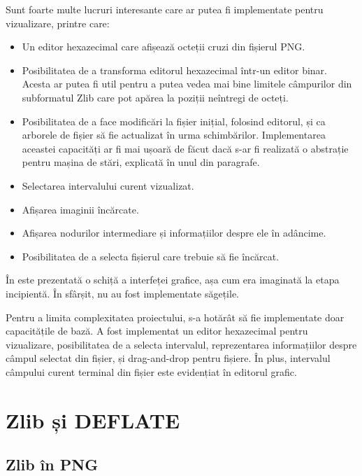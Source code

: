 \documentclass[a4paper,12pt]{report}
\begin{document}
Sunt foarte multe lucruri interesante care ar putea fi implementate pentru vizualizare, printre care:
\begin{itemize}
    \item
        Un editor hexazecimal care afișează octeții cruzi din fișierul \ac{PNG}. 
    \item
        Posibilitatea de a transforma editorul hexazecimal într-un editor binar.
        Acesta ar putea fi util pentru a putea vedea mai bine limitele câmpurilor din
        subformatul Zlib care pot apărea la poziții neîntregi de octeți.
    \item
        Posibilitatea de a face modificări la fișier inițial, folosind editorul,
        și ca arborele de fișier să fie actualizat în urma schimbărilor.
        Implementarea aceastei capacități ar fi mai ușoară de făcut dacă s-ar fi realizată
        o abstrație pentru mașina de stări, explicată în unul din paragrafe.
    \item
        Selectarea intervalului curent vizualizat.
    \item
        Afișarea imaginii încărcate.
    \item
        Afișarea nodurilor intermediare și informațiilor despre ele în adâncime.
    \item
        Posibilitatea de a selecta fișierul care trebuie să fie încărcat.
\end{itemize}

În  este prezentată o schiță a interfeței grafice,
așa cum era imaginată la etapa incipientă.
În sfârșit, nu au fost implementate săgețile.


Pentru a limita complexitatea proiectului, s-a hotărât să fie implementate doar capacitățile de bază.
A fost implementat un editor hexazecimal pentru vizualizare, posibilitatea de a selecta intervalul,
reprezentarea informațiilor despre câmpul selectat din fișier, și drag-and-drop pentru fișiere.
În plus, intervalul câmpului curent terminal din fișier este evidențiat în editorul grafic.

\section{Zlib și DEFLATE}

\subsection{Zlib în \acs{PNG}}
\end{document}
